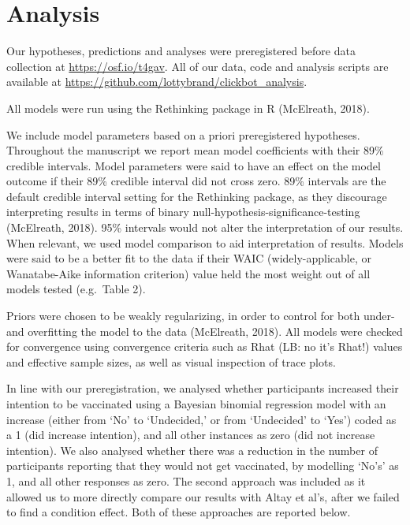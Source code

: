 \documentclass[
  english,
  ,jou,floatsintext]{apa6}
\begin{document}
\hypertarget{analysis}{%
\section{Analysis}\label{analysis}}

Our hypotheses, predictions and analyses were preregistered before data collection at \url{https://osf.io/t4gav}. All of our data, code and analysis scripts are available at \url{https://github.com/lottybrand/clickbot_analysis}.

All models were run using the Rethinking package in R (McElreath, 2018).

We include model parameters based on a priori preregistered hypotheses. Throughout the manuscript we report mean model coefficients with their 89\% credible intervals. Model parameters were said to have an effect on the model outcome if their 89\% credible interval did not cross zero. 89\% intervals are the default credible interval setting for the Rethinking package, as they discourage interpreting results in terms of binary null-hypothesis-significance-testing (McElreath, 2018). 95\% intervals would not alter the interpretation of our results. When relevant, we used model comparison to aid interpretation of results. Models were said to be a better fit to the data if their WAIC (widely-applicable, or Wanatabe-Aike information criterion) value held the most weight out of all models tested (e.g.~Table 2).

Priors were chosen to be weakly regularizing, in order to control for both under- and overfitting the model to the data (McElreath, 2018). All models were checked for convergence using convergence criteria such as Rhat (LB: no it's Rhat!) values and effective sample sizes, as well as visual inspection of trace plots.

In line with our preregistration, we analysed whether participants increased their intention to be vaccinated using a Bayesian binomial regression model with an increase (either from `No' to `Undecided,' or from `Undecided' to `Yes') coded as a 1 (did increase intention), and all other instances as zero (did not increase intention). We also analysed whether there was a reduction in the number of participants reporting that they would not get vaccinated, by modelling `No's' as 1, and all other responses as zero. The second approach was included as it allowed us to more directly compare our results with Altay et al's, after we failed to find a condition effect. Both of these approaches are reported below.
\end{document}

